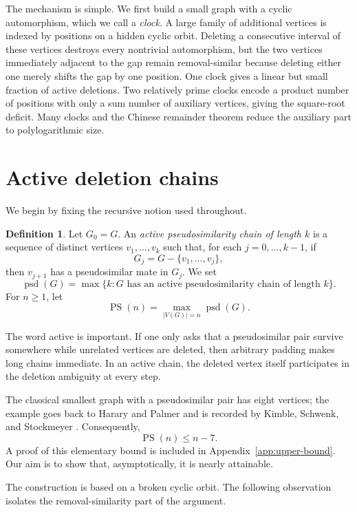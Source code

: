\documentclass[11pt]{article}
\theoremstyle{definition}
\newtheorem{definition}[theorem]{Definition}
\theoremstyle{remark}
\newcommand{\psd}{\operatorname{psd}}
\newcommand{\PS}{\operatorname{PS}}
\begin{document}
The mechanism is simple. We first build a small graph with a cyclic automorphism, which we call a \emph{clock}. A large family of additional vertices is indexed by positions on a hidden cyclic orbit. Deleting a consecutive interval of these vertices destroys every nontrivial automorphism, but the two vertices immediately adjacent to the gap remain removal-similar because deleting either one merely shifts the gap by one position. One clock gives a linear but small fraction of active deletions. Two relatively prime clocks encode a product number of positions with only a sum number of auxiliary vertices, giving the square-root deficit. Many clocks and the Chinese remainder theorem reduce the auxiliary part to polylogarithmic size.

\section{Active deletion chains}

We begin by fixing the recursive notion used throughout.

\begin{definition}
Let $G_0=G$. An \emph{active pseudosimilarity chain of length $k$} is a sequence of distinct vertices $v_1,\ldots,v_k$ such that, for each $j=0,\ldots,k-1$, if
\[
    G_j=G-\{v_1,\ldots,v_j\},
\]
then $v_{j+1}$ has a pseudosimilar mate in $G_j$. We set
\[
    \psd(G)=\max\{k: G\text{ has an active pseudosimilarity chain of length }k\}.
\]
For $n\ge1$, let
\[
    \PS(n)=\max_{|V(G)|=n}\psd(G).
\]
\end{definition}

The word active is important. If one only asks that a pseudosimilar pair survive somewhere while unrelated vertices are deleted, then arbitrary padding makes long chains immediate. In an active chain, the deleted vertex itself participates in the deletion ambiguity at every step.

The classical smallest graph with a pseudosimilar pair has eight vertices; the example goes back to Harary and Palmer and is recorded by Kimble, Schwenk, and Stockmeyer \cite{KimbleSchwenkStockmeyer1981}. Consequently,
\begin{equation}\label{eq:trivial-upper}
    \PS(n)\le n-7.
\end{equation}
A proof of this elementary bound is included in Appendix~\ref{app:upper-bound}. Our aim is to show that, asymptotically, it is nearly attainable.

The construction is based on a broken cyclic orbit. The following observation isolates the removal-similarity part of the argument.
\end{document}
